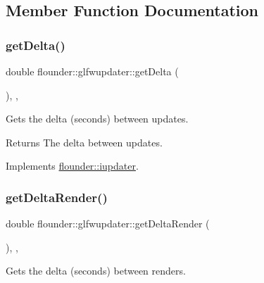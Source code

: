 \subsection{Member Function Documentation}
\mbox{\label{classflounder_1_1glfwupdater_a8da4916f3335126413a072203b94a735}} 
\subsubsection{\texorpdfstring{get\+Delta()}{getDelta()}}
{\footnotesize\ttfamily double flounder\+::glfwupdater\+::get\+Delta (\begin{DoxyParamCaption}{ }\end{DoxyParamCaption})\hspace{0.3cm}{\ttfamily [inline]}, {\ttfamily [override]}, {\ttfamily [virtual]}}



Gets the delta (seconds) between updates. 

\begin{DoxyReturn}{Returns}
The delta between updates. 
\end{DoxyReturn}


Implements \hyperlink{classflounder_1_1iupdater_a1e8d40602f9799fc82d96d5b845cf796}{flounder\+::iupdater}.

\mbox{\label{classflounder_1_1glfwupdater_a3f8d8a108c8db0d2ead35088646687c9}} 
\subsubsection{\texorpdfstring{get\+Delta\+Render()}{getDeltaRender()}}
{\footnotesize\ttfamily double flounder\+::glfwupdater\+::get\+Delta\+Render (\begin{DoxyParamCaption}{ }\end{DoxyParamCaption})\hspace{0.3cm}{\ttfamily [inline]}, {\ttfamily [override]}, {\ttfamily [virtual]}}



Gets the delta (seconds) between renders. 

